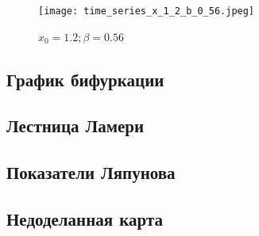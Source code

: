         \begin{figure}[h!]
            \centering
            \texttt{[image: time\_series\_x\_1\_2\_b\_0\_56.jpeg]}

            \captionsetup{justification=centering}
            \caption{\(x_0 = 1.2; \beta = 0.56\)}
            \label{time_series_x_1_2_b_0_56}
        \end{figure}

    \subsection{График бифуркации}

    \subsection{Лестница Ламери}

    \subsection{Показатели Ляпунова}

    \subsection{Недоделанная карта}